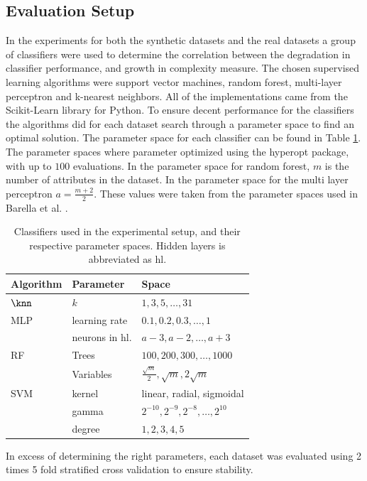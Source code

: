 \subsection{Evaluation Setup}
In the experiments for both the synthetic datasets and the real datasets a group of classifiers were used to determine the correlation between the degradation in classifier performance, and growth in complexity measure. The chosen supervised learning algorithms were support vector machines, random forest, multi-layer perceptron and k-nearest neighbors. All of the implementations came from the Scikit-Learn library for Python. To ensure decent performance for the classifiers the algorithms did for each dataset search through a parameter space to find an optimal solution. The parameter space for each classifier can be found in Table \ref{tab:param_space}. The parameter spaces where parameter optimized using the hyperopt package, with up to $100$ evaluations. In the parameter space for random forest, $m$ is the number of attributes in the dataset. In the parameter space for the multi layer perceptron $a=\frac{m+2}{2}$. These values were taken from the parameter spaces used in Barella et al. \cite{DBLP:journals/isci/BarellaGSLC21}.
\begin{table}[tbp]
    \centering
    \begin{tabular}{lll}
        \toprule
        Algorithm & Parameter & Space \\
        \midrule
        $\knn$ & $k$ & $1,3,5,\dots,31$ \\ 
        \midrule
        MLP & learning rate & $0.1,0.2,0.3,\dots,1$ \\
                            & neurons in hl. & $a-3,a-2,\dots,a+3$ \\
        \midrule
        RF & Trees & $100,200,300,\dots,1000$ \\
           & Variables & $\frac{\sqrt{m}}{2},\sqrt{m},2\sqrt{m}$ \\
        \midrule 
        SVM & kernel & linear, radial, sigmoidal \\
            & gamma & $2^{-10},2^{-9},2^{-8},\dots,2^{10}$ \\
            & degree & $1,2,3,4,5$ \\
        \bottomrule
    \end{tabular}
    \caption{\label{tab:param_space}Classifiers used in the experimental setup, and their respective parameter spaces. Hidden layers is abbreviated as hl.}
\end{table}
In excess of determining the right parameters, each dataset was evaluated using 2 times 5 fold stratified cross validation to ensure stability. 


